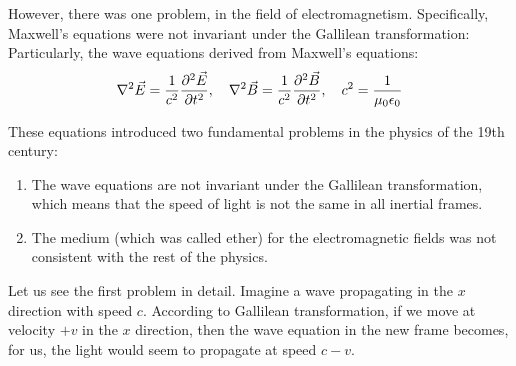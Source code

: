 However, there was one problem, in the field of electromagnetism.
Specifically, Maxwell's equations were not invariant under the Gallilean transformation:
Particularly, the wave equations derived from Maxwell's equations:
\begin{gather}
  \nabla^2 \vec{E} = \frac{1}{c^2}\pdv[2]{\vec{E}}{t}, \quad  \nabla^2 \vec{B}  = \frac{1}{c^2}\pdv[2]{\vec{B}}{t}, \quad c^2 = \frac{1}{\mu_0\epsilon_0}
\end{gather}

These equations introduced two fundamental problems in the physics of the 19th century:
\begin{enumerate}
  \item The wave equations are not invariant under the Gallilean transformation, which means that the speed of light is not the same in all inertial frames.
  \item The medium (which was called ether) for the electromagnetic fields was not consistent with the rest of the physics.
\end{enumerate}
Let us see the first problem in detail. Imagine a wave propagating in the $x$ direction with speed $c$.
According to Gallilean transformation,
if we move at velocity $+v$ in the $x$ direction, then the wave equation in the new frame becomes, for us, the light would seem to propagate at speed $c - v$.

